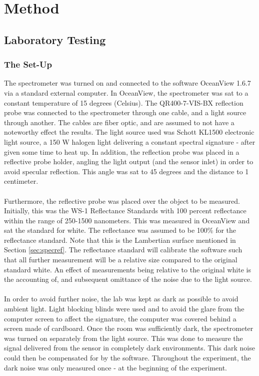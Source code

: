 \chapter{Method}
\label{chap:method}

\section{Laboratory Testing}
\subsection{The Set-Up}
The spectrometer was turned on and connected to the software OceanView 1.6.7 via a standard external computer. In OceanView, the spectrometer was sat to a constant temperature of 15 degrees (Celsius). The QR400-7-VIS-BX reflection probe was connected to the spectrometer through one cable, and a light source through another. The cables are fiber optic, and are assumed to not have a noteworthy effect the results. The light source used was Schott KL1500 electronic light source, a 150 W halogen light delivering a constant spectral signature - after given some time to heat up. In addition, the reflection probe was placed in a reflective probe holder, angling the light output (and the sensor inlet) in order to avoid specular reflection. This angle was sat to 45 degrees and the distance to 1 centimeter.
\\\\
Furthermore, the reflective probe was placed over the object to be measured. Initially, this was the WS-1 Reflectance Standards with 100 percent reflectance within the range of 250-1500 nanometers. This was measured in OceanView and sat the standard for white. The reflectance was assumed to be 100\% for the reflectance standard. Note that this is the Lambertian surface mentioned in Section \ref{sec:specref}. The reflectance standard will calibrate the software such that all further measurement will be a relative size compared to the original standard white. An effect of measurements being relative to the original white is the accounting of, and subsequent omittance of the noise due to the light source. 
\\\\
In order to avoid further noise, the lab was kept as dark as possible to avoid ambient light. Light blocking blinds were used and to avoid the glare from the computer screen to affect the signature, the computer was covered behind a screen made of cardboard. Once the room was sufficiently dark, the spectrometer was turned on separately from the light source. This was done to measure the signal delivered from the sensor in completely dark environments. This dark noise could then be compensated for by the software. Throughout the experiment, the dark noise was only measured once - at the beginning of the experiment.
